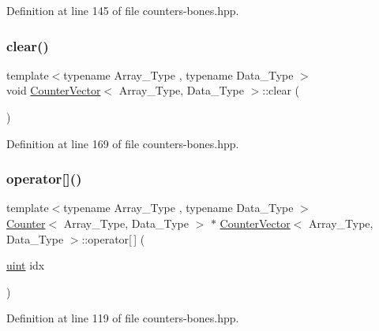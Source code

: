 Definition at line 145 of file counters-\/bones.\+hpp.

\mbox{\label{class_counter_vector_acce75748f917e3a7898d49a23df996e7}} 
\subsubsection{\texorpdfstring{clear()}{clear()}}
{\footnotesize\ttfamily template$<$typename Array\+\_\+\+Type , typename Data\+\_\+\+Type $>$ \\
void \hyperlink{class_counter_vector}{Counter\+Vector}$<$ Array\+\_\+\+Type, Data\+\_\+\+Type $>$\+::clear (\begin{DoxyParamCaption}{ }\end{DoxyParamCaption})\hspace{0.3cm}{\ttfamily [inline]}}



Definition at line 169 of file counters-\/bones.\+hpp.

\mbox{\label{class_counter_vector_a6eac3e73298e1e6d424b92f324ffe9a8}} 
\subsubsection{\texorpdfstring{operator[]()}{operator[]()}}
{\footnotesize\ttfamily template$<$typename Array\+\_\+\+Type , typename Data\+\_\+\+Type $>$ \\
\hyperlink{class_counter}{Counter}$<$ Array\+\_\+\+Type, Data\+\_\+\+Type $>$ $\ast$ \hyperlink{class_counter_vector}{Counter\+Vector}$<$ Array\+\_\+\+Type, Data\+\_\+\+Type $>$\+::operator\mbox{[}$\,$\mbox{]} (\begin{DoxyParamCaption}\item[{\hyperlink{typedefs_8hpp_a91ad9478d81a7aaf2593e8d9c3d06a14}{uint}}]{idx }\end{DoxyParamCaption})\hspace{0.3cm}{\ttfamily [inline]}}



Definition at line 119 of file counters-\/bones.\+hpp.

\mbox{\label{class_counter_vector_affee3825ee1b1ce01b926f443c67f585}} 
